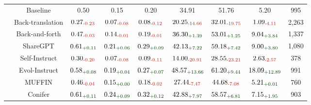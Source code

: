 \begin{table}[pos=tbp]
{\begin{tabular}{c|c|ccc|cc|cc}
\midrule
{} 
& Baseline & 0.50 & 0.15 & 0.20 & 34.91 & 51.76 & 5.20 & 995 \\
& Back-translation & $\text{0.27}_{\textcolor{deepred}{\text{-0.23}}}$ & $\text{0.07}_{\textcolor{deepred}{\text{-0.08}}}$ & $\text{0.08}_{\textcolor{deepred}{\text{-0.12}}}$ & $\text{20.25}_{\textcolor{deepred}{\text{-14.66}}}$ & $\text{32.01}_{\textcolor{deepred}{\text{-19.75}}}$ & $\text{1.09}_{\textcolor{deepred}{\text{-4.11}}}$ & 2,263 \\
& Back-and-forth & $\text{0.47}_{\textcolor{deepred}{\text{-0.03}}}$ & $\text{0.14}_{\textcolor{deepred}{\text{-0.01}}}$ & $\text{0.19}_{\textcolor{deepred}{\text{-0.01}}}$ & $\text{36.30}_{\textcolor{deepgreen}{\text{+1.39}}}$ & $\text{53.01}_{\textcolor{deepgreen}{\text{+1.25}}}$ & $\text{9.04}_{\textcolor{deepgreen}{\text{+3.84}}}$ & 1,337 \\
& ShareGPT & $\text{0.61}_{\textcolor{deepgreen}{\text{+0.11}}}$ & $\text{0.21}_{\textcolor{deepgreen}{\text{+0.06}}}$ & $\text{0.29}_{\textcolor{deepgreen}{\text{+0.09}}}$ & $\text{42.13}_{\textcolor{deepgreen}{\text{+7.22}}}$ & $\text{59.18}_{\textcolor{deepgreen}{\text{+7.42}}}$ & $\text{9.00}_{\textcolor{deepgreen}{\text{+3.80}}}$ & 1,080 \\
& Self-Instruct & $\text{0.30}_{\textcolor{deepred}{\text{-0.20}}}$ & $\text{0.07}_{\textcolor{deepred}{\text{-0.08}}}$ & $\text{0.09}_{\textcolor{deepred}{\text{-0.11}}}$ & $\text{14.00}_{\textcolor{deepred}{\text{-20.91}}}$ & $\text{28.55}_{\textcolor{deepred}{\text{-23.21}}}$ & $\text{2.63}_{\textcolor{deepred}{\text{-2.57}}}$ & 378 \\
& Evol-Instruct & $\text{0.58}_{\textcolor{deepgreen}{\text{+0.08}}}$ & $\text{0.19}_{\textcolor{deepgreen}{\text{+0.04}}}$ & $\text{0.27}_{\textcolor{deepgreen}{\text{+0.07}}}$ & $\text{48.57}_{\textcolor{deepgreen}{\text{+13.66}}}$ & $\text{61.20}_{\textcolor{deepgreen}{\text{+9.44}}}$ & $\text{18.09}_{\textcolor{deepgreen}{\text{+12.89}}}$ & 991 \\
& MUFFIN & $\text{0.46}_{\textcolor{deepred}{\text{-0.04}}}$ & $\text{0.15}_{\textcolor{deepgreen}{\text{+0.00}}}$ & $\text{0.18}_{\textcolor{deepred}{\text{-0.02}}}$ & $\text{27.44}_{\textcolor{deepred}{\text{-7.47}}}$ & $\text{44.68}_{\textcolor{deepred}{\text{-7.08}}}$ & $\text{5.21}_{\textcolor{deepgreen}{\text{+0.01}}}$ & 760 \\
& Conifer & $\text{0.61}_{\textcolor{deepgreen}{\text{+0.11}}}$ & $\text{0.24}_{\textcolor{deepgreen}{\text{+0.09}}}$ & $\text{0.32}_{\textcolor{deepgreen}{\text{+0.12}}}$ & $\text{42.88}_{\textcolor{deepgreen}{\text{+7.97}}}$ & $\text{58.57}_{\textcolor{deepgreen}{\text{+6.81}}}$ & $\text{7.15}_{\textcolor{deepgreen}{\text{+1.95}}}$ & 903 \\

\end{tabular}}
\end{table}
